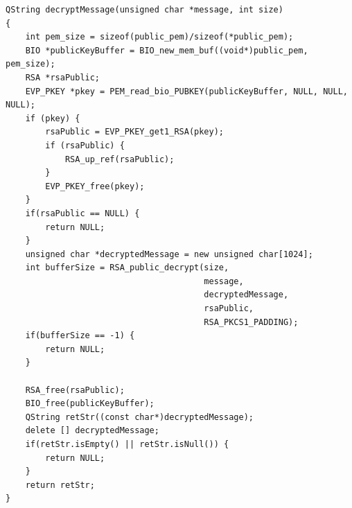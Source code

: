 \begin{lstlisting}
QString decryptMessage(unsigned char *message, int size)
{
    int pem_size = sizeof(public_pem)/sizeof(*public_pem);
    BIO *publicKeyBuffer = BIO_new_mem_buf((void*)public_pem, pem_size);
    RSA *rsaPublic;
    EVP_PKEY *pkey = PEM_read_bio_PUBKEY(publicKeyBuffer, NULL, NULL, NULL);
    if (pkey) {
        rsaPublic = EVP_PKEY_get1_RSA(pkey);
        if (rsaPublic) {
            RSA_up_ref(rsaPublic);
        }
        EVP_PKEY_free(pkey);
    }
    if(rsaPublic == NULL) {
        return NULL;
    }
    unsigned char *decryptedMessage = new unsigned char[1024];
    int bufferSize = RSA_public_decrypt(size,
                                        message,
                                        decryptedMessage,
                                        rsaPublic,
                                        RSA_PKCS1_PADDING);
    if(bufferSize == -1) {
        return NULL;
    }

    RSA_free(rsaPublic);
    BIO_free(publicKeyBuffer);
    QString retStr((const char*)decryptedMessage);
    delete [] decryptedMessage;
    if(retStr.isEmpty() || retStr.isNull()) {
        return NULL;
    }
    return retStr;
}

\end{lstlisting}